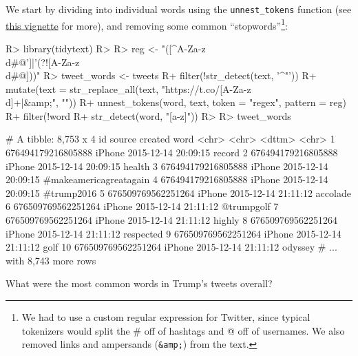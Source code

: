\documentclass[
]{jss}
\begin{document}
We start by dividing into individual words using the
\texttt{unnest\_tokens} function (see
\href{https://cran.r-project.org/web/packages/tidytext/vignettes/tidytext.html}{this
vignette} for more), and removing some common ``stopwords''\footnote{We
  had to use a custom regular expression for Twitter, since typical
  tokenizers would split the \# off of hashtags and @ off of usernames.
  We also removed links and ampersands (\texttt{\&amp;}) from the text.}:

\begin{CodeChunk}

\begin{CodeInput}
R> library(tidytext)
R> 
R> reg <- "([^A-Za-z\\d#@']|'(?![A-Za-z\\d#@]))"
R> tweet_words <- tweets %
R+   filter(!str_detect(text, '^"')) %
R+   mutate(text = str_replace_all(text, "https://t.co/[A-Za-z\\d]+|&amp;", "")) %
R+   unnest_tokens(word, text, token = "regex", pattern = reg) %
R+   filter(!word %
R+          str_detect(word, "[a-z]"))
R> 
R> tweet_words
\end{CodeInput}

\begin{CodeOutput}
# A tibble: 8,753 x 4
   id                 source created             word                  
   <chr>              <chr>  <dttm>              <chr>                 
 1 676494179216805888 iPhone 2015-12-14 20:09:15 record                
 2 676494179216805888 iPhone 2015-12-14 20:09:15 health                
 3 676494179216805888 iPhone 2015-12-14 20:09:15 #makeamericagreatagain
 4 676494179216805888 iPhone 2015-12-14 20:09:15 #trump2016            
 5 676509769562251264 iPhone 2015-12-14 21:11:12 accolade              
 6 676509769562251264 iPhone 2015-12-14 21:11:12 @trumpgolf            
 7 676509769562251264 iPhone 2015-12-14 21:11:12 highly                
 8 676509769562251264 iPhone 2015-12-14 21:11:12 respected             
 9 676509769562251264 iPhone 2015-12-14 21:11:12 golf                  
10 676509769562251264 iPhone 2015-12-14 21:11:12 odyssey               
# ... with 8,743 more rows
\end{CodeOutput}
\end{CodeChunk}

What were the most common words in Trump's tweets overall?
\end{document}
